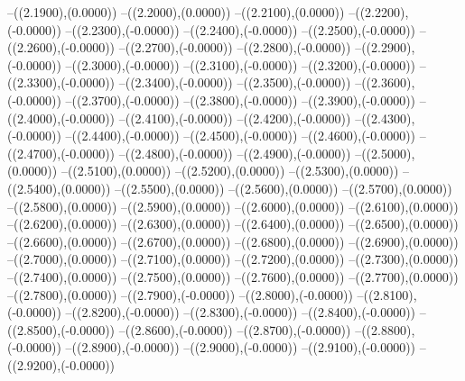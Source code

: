 {	--({\sx*(2.1900)},{\sy*(0.0000)})
	--({\sx*(2.2000)},{\sy*(0.0000)})
	--({\sx*(2.2100)},{\sy*(0.0000)})
	--({\sx*(2.2200)},{\sy*(-0.0000)})
	--({\sx*(2.2300)},{\sy*(-0.0000)})
	--({\sx*(2.2400)},{\sy*(-0.0000)})
	--({\sx*(2.2500)},{\sy*(-0.0000)})
	--({\sx*(2.2600)},{\sy*(-0.0000)})
	--({\sx*(2.2700)},{\sy*(-0.0000)})
	--({\sx*(2.2800)},{\sy*(-0.0000)})
	--({\sx*(2.2900)},{\sy*(-0.0000)})
	--({\sx*(2.3000)},{\sy*(-0.0000)})
	--({\sx*(2.3100)},{\sy*(-0.0000)})
	--({\sx*(2.3200)},{\sy*(-0.0000)})
	--({\sx*(2.3300)},{\sy*(-0.0000)})
	--({\sx*(2.3400)},{\sy*(-0.0000)})
	--({\sx*(2.3500)},{\sy*(-0.0000)})
	--({\sx*(2.3600)},{\sy*(-0.0000)})
	--({\sx*(2.3700)},{\sy*(-0.0000)})
	--({\sx*(2.3800)},{\sy*(-0.0000)})
	--({\sx*(2.3900)},{\sy*(-0.0000)})
	--({\sx*(2.4000)},{\sy*(-0.0000)})
	--({\sx*(2.4100)},{\sy*(-0.0000)})
	--({\sx*(2.4200)},{\sy*(-0.0000)})
	--({\sx*(2.4300)},{\sy*(-0.0000)})
	--({\sx*(2.4400)},{\sy*(-0.0000)})
	--({\sx*(2.4500)},{\sy*(-0.0000)})
	--({\sx*(2.4600)},{\sy*(-0.0000)})
	--({\sx*(2.4700)},{\sy*(-0.0000)})
	--({\sx*(2.4800)},{\sy*(-0.0000)})
	--({\sx*(2.4900)},{\sy*(-0.0000)})
	--({\sx*(2.5000)},{\sy*(0.0000)})
	--({\sx*(2.5100)},{\sy*(0.0000)})
	--({\sx*(2.5200)},{\sy*(0.0000)})
	--({\sx*(2.5300)},{\sy*(0.0000)})
	--({\sx*(2.5400)},{\sy*(0.0000)})
	--({\sx*(2.5500)},{\sy*(0.0000)})
	--({\sx*(2.5600)},{\sy*(0.0000)})
	--({\sx*(2.5700)},{\sy*(0.0000)})
	--({\sx*(2.5800)},{\sy*(0.0000)})
	--({\sx*(2.5900)},{\sy*(0.0000)})
	--({\sx*(2.6000)},{\sy*(0.0000)})
	--({\sx*(2.6100)},{\sy*(0.0000)})
	--({\sx*(2.6200)},{\sy*(0.0000)})
	--({\sx*(2.6300)},{\sy*(0.0000)})
	--({\sx*(2.6400)},{\sy*(0.0000)})
	--({\sx*(2.6500)},{\sy*(0.0000)})
	--({\sx*(2.6600)},{\sy*(0.0000)})
	--({\sx*(2.6700)},{\sy*(0.0000)})
	--({\sx*(2.6800)},{\sy*(0.0000)})
	--({\sx*(2.6900)},{\sy*(0.0000)})
	--({\sx*(2.7000)},{\sy*(0.0000)})
	--({\sx*(2.7100)},{\sy*(0.0000)})
	--({\sx*(2.7200)},{\sy*(0.0000)})
	--({\sx*(2.7300)},{\sy*(0.0000)})
	--({\sx*(2.7400)},{\sy*(0.0000)})
	--({\sx*(2.7500)},{\sy*(0.0000)})
	--({\sx*(2.7600)},{\sy*(0.0000)})
	--({\sx*(2.7700)},{\sy*(0.0000)})
	--({\sx*(2.7800)},{\sy*(0.0000)})
	--({\sx*(2.7900)},{\sy*(-0.0000)})
	--({\sx*(2.8000)},{\sy*(-0.0000)})
	--({\sx*(2.8100)},{\sy*(-0.0000)})
	--({\sx*(2.8200)},{\sy*(-0.0000)})
	--({\sx*(2.8300)},{\sy*(-0.0000)})
	--({\sx*(2.8400)},{\sy*(-0.0000)})
	--({\sx*(2.8500)},{\sy*(-0.0000)})
	--({\sx*(2.8600)},{\sy*(-0.0000)})
	--({\sx*(2.8700)},{\sy*(-0.0000)})
	--({\sx*(2.8800)},{\sy*(-0.0000)})
	--({\sx*(2.8900)},{\sy*(-0.0000)})
	--({\sx*(2.9000)},{\sy*(-0.0000)})
	--({\sx*(2.9100)},{\sy*(-0.0000)})
	--({\sx*(2.9200)},{\sy*(-0.0000)})
}
